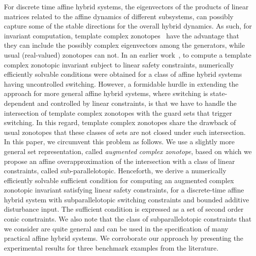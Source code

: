 

For discrete time affine hybrid systems, the eigenvectors of the
products of linear matrices related to the affine dynamics of
different subsystems, can possibly capture some of the stable
directions for the overall hybrid dynamics.  As such, for invariant
computation, template complex zonotopes~\cite{tcz2017} have the
advantage that they can include the possibly complex eigenvectors
among the generators, while usual (real-valued) zonotopes can not. In
an earlier work~\cite{tcz2017}, to compute a template complex
zonotopic invariant subject to linear safety constraints, numerically
efficiently solvable conditions were obtained for a class of affine
hybrid systems having uncontrolled switching. However, a formidable
hurdle in extending the approach for more general affine hybrid
systems, where switching is state-dependent and controlled by linear
constraints, is that we have to handle the intersection of template
complex zonotopes with the guard sets that trigger switching. In this
regard, template complex zonotopes share the drawback of usual
zonotopes that these classes of sets are not closed under
such intersection. In this paper, we circumvent this problem as follows. We
use a slightly more general set representation, called \emph{augmented
complex zonotope}, based on which we propose an affine
overapproximation of the intersection with a class of linear
constraints, called sub-parallelotopic.  Henceforth, we derive a
numerically efficiently solvable sufficient condition for computing an
augmented complex zonotopic invariant satisfying linear safety
constraints, for a discrete-time affine hybrid system with
subparallelotopic switching constraints and bounded additive
disturbance input.  The sufficient condition is expressed as a set of
second order conic constraints.  We also note that the class of
subparallelotopic constraints that we consider are quite general and
can be used in the specification of many practical affine hybrid
systems. We corroborate our approach by presenting the experimental
results for three benchmark examples from the literature.\\


